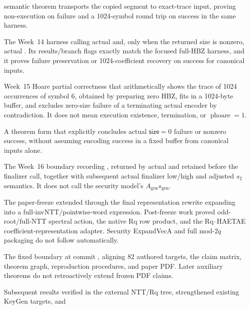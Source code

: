 \begin{description}[style=nextline,leftmargin=3.1cm]
  semantic theorem transports the copied segment to exact-trace input, proving
  non-execution on failure and a 1024-symbol round trip on success in the same harness.
  \item[Production full-HBZ harness] The Week~14 harness calling actual
   and, only when the
  returned size is nonzero, actual
  . Its results/branch
  flags exactly match the focused full-HBZ harness, and it proves failure
  preservation or 1024-coefficient recovery on success for canonical inputs.
  \item[Fixed all-six success witness] Week~15 Hoare partial correctness that
  arithmetically shows the trace of 1024 occurrences of symbol 6, obtained by
  preparing zero HBZ, fits in a 1024-byte buffer, and excludes zero-size failure
  of a terminating actual encoder by contradiction. It does not mean execution
  existence, termination, or \(\operatorname{phoare}=1\).
  \item[Success-conditioned] A theorem form that explicitly concludes actual
  \(\mathsf{size}=0\) failure or nonzero success, without assuming encoding success
  in a fixed buffer from canonical inputs alone.
  \item[KeyGen snapshot] The Week~16 boundary recording ,
  returned by actual  and retained before the finalizer
  call, together with subsequent actual finalizer low/high and adjusted \(s_2\)
  semantics. It does not call  the security model's
  \(A_{\mathrm{gen}}s_{\mathrm{gen}}\).
  \item[NTT multiplication bridge] The paper-freeze 
  extended through the final representation rewrite expanding
   into a full-invNTT/pointwise-word
  expression. Post-freeze work proved odd-root/full-NTT spectral action, the native
  Rq row product, and the Rq--HAETAE coefficient-representation adapter. Security
  ExpandVecA and full mod-\(2q\) packaging do not follow automatically.
  \item[Paper freeze] The fixed boundary at commit , aligning
  82 authored targets, the claim matrix, theorem graph, reproduction procedures,
  and paper PDF. Later auxiliary theorems do not retroactively extend frozen PDF claims.
  \item[Post-freeze auxiliary layer] Subsequent results verified in the external
  NTT/Rq tree, strengthened existing KeyGen targets, and 

\end{description}
